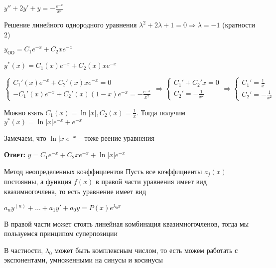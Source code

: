 \documentclass[12pt]{article}
\begin{document}
\begin{Example}{}
    $y'' + 2y' + y = -\frac{e^{-x}}{x^2}$

    Решение линейного однородного уравнения $\lambda^2 + 2\lambda + 1 = 0 \Rightarrow \lambda = -1$ (кратности 2)

    $y_\text{ОО} = C_1e^{-x} + C_2xe^{-x}$

    $y^*(x) = C_1(x)e^{-x} + C_2(x)xe^{-x}$

    $\begin{cases}
        C_1'(x)e^{-x} + C_2'(x)xe^{-x} = 0 \\
        -C_1'(x)e^{-x} + C_2'(x)(1 - x)e^{-x} = -\frac{e^{-x}}{x^2}
    \end{cases} \Rightarrow \begin{cases}
        C_1' + C_2'x = 0 \\
        C_2' = -\frac{1}{x^2}
    \end{cases} \Rightarrow \begin{cases}
        C_1' = \frac{1}{x} \\
        C_2' = -\frac{1}{x^2}
    \end{cases}$

    Можно взять $C_1(x) = \ln|x|, C_2(x) = \frac{1}{x}$. Тогда получим $y^*(x) = \ln|x|e^{-x} + e^{-x}$

    Замечаем, что $\ln|x|e^{-x}$ -- тоже реение уравнения

    \textbf{Ответ:} $y = C_1e^{-x} + C_2xe^{-x} + \ln|x|e^{-x}$
\end{Example}

\begin{defin}{Метод неопределенных коэффициентов}
    Пусть все коэффициенты $a_j(x)$ постоянны, а функция $f(x)$ в правой части уравнения имеет вид квазимногочлена, то есть уравнение имеет вид 

    $a_ny^{(n)} + \ldots + a_1y' + a_0y = P(x)e^{\lambda_0 x}$

    В правой части может стоять линейная комбинация квазимногочленов, тогда мы пользуемся принципом суперпозиции

    В частности, $\lambda_0$ может быть комплексным числом, то есть можем работать с экспонентами, умноженными на синусы и косинусы
\end{defin}
\end{document}
